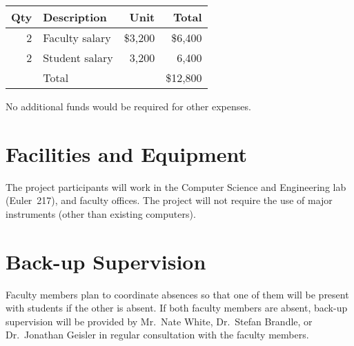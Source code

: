 \documentclass{article}
\begin{document}
\begin{center}
  \begin{tabular}{rlrr} \toprule
    Qty & Description    & Unit    & Total    \\ \midrule
    2   & Faculty salary & \$3,200 & \$6,400  \\
    2   & Student salary & 3,200   & 6,400    \\ \midrule
        & Total          &         & \$12,800 \\ \bottomrule
  \end{tabular}
\end{center}

No additional funds would be required for other expenses.

\section{Facilities and Equipment}
\label{sec:facilities-equipment}


The project participants will work in
the Computer Science and Engineering lab (Euler~217), and
faculty offices.
The project will not require the use of major instruments
(other than existing computers).

\section{Back-up Supervision}
\label{sec:back-up-supervision}


Faculty members plan to coordinate absences
so that one of them will be present with students if the other is absent.
If both faculty members are absent,
back-up supervision will be provided by
Mr.\ Nate White,
Dr.\ Stefan Brandle, or
Dr.\ Jonathan Geisler
in regular consultation with the faculty members.
\end{document}

